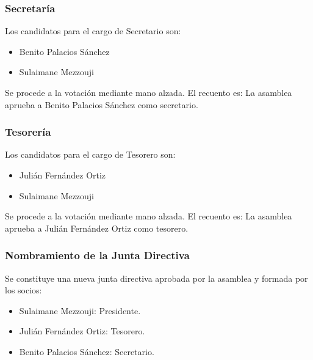 \documentclass[12pt,twoside,openany,a4paper]{book}
\begin{document}
    \subsubsection{Secretaría}
    \noindent Los candidatos para el cargo de Secretario son:
    \begin{itemize}
        \item Benito Palacios Sánchez
        \item Sulaimane Mezzouji
    \end{itemize}
    Se procede a la votación mediante mano alzada. El recuento es:
    \noindent{}La asamblea aprueba a Benito Palacios Sánchez como secretario.

    \subsubsection{Tesorería}
    \noindent Los candidatos para el cargo de Tesorero son:
    \begin{itemize}
        \item Julián Fernández Ortiz
        \item Sulaimane Mezzouji
    \end{itemize}
    Se procede a la votación mediante mano alzada. El recuento es:
    \noindent{}La asamblea aprueba a Julián Fernández Ortiz como tesorero.

    \subsubsection{Nombramiento de la Junta Directiva}
    Se constituye una nueva junta directiva aprobada por la asamblea y formada por los socios:
    \begin{itemize}
        \item Sulaimane Mezzouji: Presidente.
        \item Julián Fernández Ortiz: Tesorero.
        \item Benito Palacios Sánchez: Secretario.
    \end{itemize}
\end{document}
